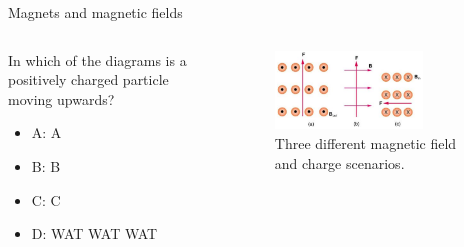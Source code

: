 \documentclass{beamer}
\begin{document}
\begin{frame}{Magnets and magnetic fields}
\begin{columns}[T]
\begin{column}{0.3\textwidth}
In which of the diagrams is a positively charged particle moving upwards?
\begin{itemize}
\item A: A
\item B: B
\item C: C
\item D: WAT WAT WAT
\end{itemize}
\end{column}
\begin{column}{0.7\textwidth}
\begin{figure}
\centering
\includegraphics[width=0.75\textwidth]{figures/lorentzProblem.png}
\caption{\label{fig:lorentzProblem3} Three different magnetic field and charge scenarios.}
\end{figure}
\end{column}
\end{columns}
\end{frame}
\end{document}
